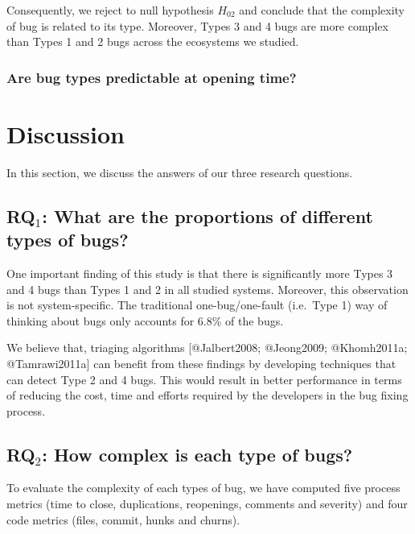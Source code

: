 Consequently, we reject to null hypothesis \(H_{02}\) and conclude that
the complexity of bug is related to its type. Moreover, Types 3 and 4
bugs are more complex than Types 1 and 2 bugs across the ecosystems we
studied.

\subsubsection{Are bug types predictable at opening
time?}\label{are-bug-types-predictable-at-opening-time-1}

\section{Discussion}\label{discussion}

In this section, we discuss the answers of our three research questions.

\subsection{\texorpdfstring{RQ\(_1\): What are the proportions of
different types of
bugs?}{RQ\_1: What are the proportions of different types of bugs?}}\label{rqux5f1-what-are-the-proportions-of-different-types-of-bugs}

One important finding of this study is that there is significantly more
Types 3 and 4 bugs than Types 1 and 2 in all studied systems. Moreover,
this observation is not system-specific. The traditional
one-bug/one-fault (i.e.~Type 1) way of thinking about bugs only accounts
for 6.8\% of the bugs.

We believe that, triaging algorithms {[}@Jalbert2008; @Jeong2009;
@Khomh2011a; @Tamrawi2011a{]} can benefit from these findings by
developing techniques that can detect Type 2 and 4 bugs. This would
result in better performance in terms of reducing the cost, time and
efforts required by the developers in the bug fixing process.

\subsection{\texorpdfstring{RQ\(_2\): How complex is each type of
bugs?}{RQ\_2: How complex is each type of bugs?}}\label{rqux5f2-how-complex-is-each-type-of-bugs}

To evaluate the complexity of each types of bug, we have computed five
process metrics (time to close, duplications, reopenings, comments and
severity) and four code metrics (files, commit, hunks and churns).

